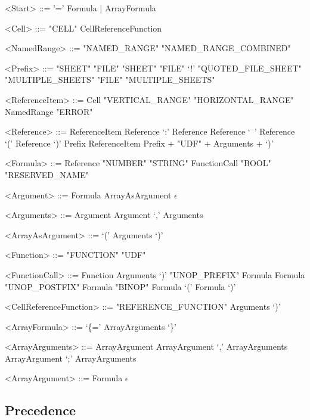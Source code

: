 \documentclass[conference]{IEEEtran}
\begin{document}
\begin{grammar}
<Start> ::= '=' Formula | ArrayFormula


%
%
%
%

<Cell> ::= "CELL"
	  \alt CellReferenceFunction


<NamedRange> ::= "NAMED_RANGE"
            \alt "NAMED_RANGE_COMBINED"

<Prefix> ::= "SHEET"
	\alt "FILE" "SHEET"
	\alt "FILE" `!'
	\alt "QUOTED_FILE_SHEET"
	\alt "MULTIPLE_SHEETS"
	\alt "FILE" "MULTIPLE_SHEETS"

<ReferenceItem> ::= Cell
	\alt "VERTICAL_RANGE"
	\alt "HORIZONTAL_RANGE"
	\alt NamedRange
	\alt "ERROR" 

<Reference> ::= ReferenceItem
	\alt Reference `:' Reference
	\alt Reference `\ ' Reference
	\alt `(' Reference `)'
	\alt Prefix ReferenceItem
              \alt Prefix + "UDF" + Arguments + `)'
              
<Formula> ::= Reference
         \alt "NUMBER"
         \alt "STRING"
         \alt FunctionCall
         \alt "BOOL"
         \alt "RESERVED_NAME"

<Argument> ::= Formula
\alt ArrayAsArgument
\alt $\epsilon$

<Arguments> ::= Argument
\alt Argument `,' Arguments

<ArrayAsArgument> ::= `(' Arguments `)'

<Function> ::= "FUNCTION"
	\alt "UDF"

<FunctionCall> ::= Function Arguments `)'
\alt "UNOP_PREFIX" Formula
\alt Formula "UNOP_POSTFIX"
\alt Formula "BINOP" Formula
\alt `(' Formula `)'

<CellReferenceFunction> ::= "REFERENCE_FUNCTION" Arguments `)'

<ArrayFormula> ::= `\{=' ArrayArguments `\}' 

<ArrayArguments> ::= ArrayArgument
 \alt ArrayArgument `,' ArrayArguments
 \alt ArrayArgument `;' ArrayArguments
 
<ArrayArgument> ::= Formula
 \alt $\epsilon$


\end{grammar}

\subsection{Precedence}
\end{document}
